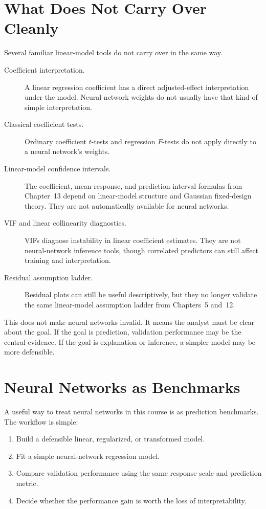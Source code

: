 \section{What Does Not Carry Over Cleanly}

Several familiar linear-model tools do not carry over in the same way.

\begin{description}
  \item[Coefficient interpretation.] A linear regression coefficient has a direct adjusted-effect interpretation under the model.  Neural-network weights do not usually have that kind of simple interpretation.
  \item[Classical coefficient tests.] Ordinary coefficient \(t\)-tests and regression \(F\)-tests do not apply directly to a neural network's weights.
  \item[Linear-model confidence intervals.] The coefficient, mean-response, and prediction interval formulas from Chapter~13 depend on linear-model structure and Gaussian fixed-design theory.  They are not automatically available for neural networks.
  \item[VIF and linear collinearity diagnostics.] VIFs diagnose instability in linear coefficient estimates.  They are not neural-network inference tools, though correlated predictors can still affect training and interpretation.
  \item[Residual assumption ladder.] Residual plots can still be useful descriptively, but they no longer validate the same linear-model assumption ladder from Chapters~5 and~12.
\end{description}

This does not make neural networks invalid.  It means the analyst must be clear about the goal.  If the goal is prediction, validation performance may be the central evidence.  If the goal is explanation or inference, a simpler model may be more defensible.

\section{Neural Networks as Benchmarks}

A useful way to treat neural networks in this course is as prediction benchmarks.  The workflow is simple:
\begin{enumerate}
  \item Build a defensible linear, regularized, or transformed model.
  \item Fit a simple neural-network regression model.
  \item Compare validation performance using the same response scale and prediction metric.
  \item Decide whether the performance gain is worth the loss of interpretability.
\end{enumerate}

